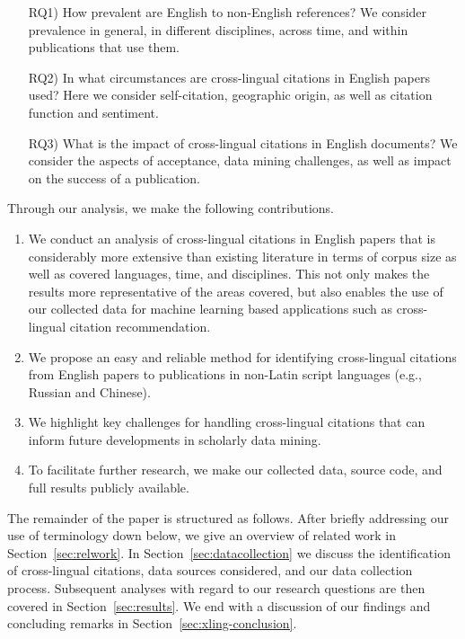 \begin{enumerate}[align=left]
\item[RQ1)] How prevalent are English to non-English references? We consider prevalence in general, in different disciplines, across time, and within publications that use them.
\item[RQ2)] In what circumstances are cross-lingual citations in English papers used? Here we consider self-citation, geographic origin, as well as citation function and sentiment.
\item[RQ3)] What is the impact of cross-lingual citations in English documents? We consider the aspects of acceptance, data mining challenges, as well as impact on the success of a publication.
\end{enumerate}

\noindent Through our analysis, we make the following contributions.

\begin{enumerate}
\item We conduct an analysis of cross-lingual citations in English papers that is considerably more extensive than existing literature in terms of corpus size as well as covered languages, time, and disciplines. This not only makes the results more representative of the areas covered, but also enables the use of our collected data for machine learning based applications such as cross-lingual citation recommendation.
\item We propose an easy and reliable method for identifying cross-lingual citations from English papers to publications in non-Latin script languages (e.g., Russian and Chinese).
\item We highlight key challenges for handling cross-lingual citations that can inform future developments in scholarly data mining.
\item To facilitate further research, we make our collected data, source code, and full results publicly available.
\end{enumerate}

\noindent The remainder of the paper is structured as follows. After briefly addressing our use of terminology down below, we give an overview of related work in Section~\ref{sec:relwork}. In Section~\ref{sec:datacollection} we discuss the identification of cross-lingual citations, data sources considered, and our data collection process. Subsequent analyses with regard to our research questions are then covered in Section~\ref{sec:results}. We end with a discussion of our findings and concluding remarks in Section~\ref{sec:xling-conclusion}.


